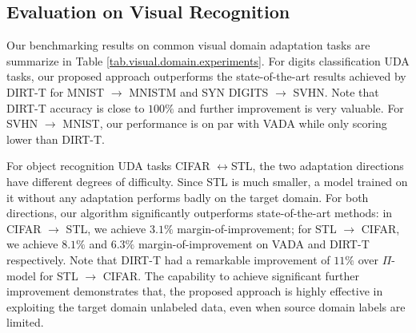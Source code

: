 \begin{table}[t]
\centering
{}
\caption{Test set accuracy ($\%$) on WiFi HAR UDA task.}
\label{tab.non-visual-domain.wifi.experiments}
\end{table}


\subsection{Evaluation on Visual Recognition}
Our benchmarking results on common visual domain adaptation tasks are summarize in Table \ref{tab.visual.domain.experiments}. For digits classification UDA tasks, our proposed approach outperforms the state-of-the-art results achieved by DIRT-T for MNIST $\rightarrow$ MNISTM and SYN DIGITS $\rightarrow$ SVHN. Note that DIRT-T accuracy is close to $100\%$ and further improvement is very valuable. For SVHN $\rightarrow$ MNIST, our performance is on par with VADA while only scoring lower than DIRT-T. 











For object recognition UDA tasks CIFAR $\leftrightarrow$STL, the two adaptation directions have different degrees of difficulty. Since STL is much smaller, a model trained on it without any adaptation performs badly on the target domain. For both directions, our algorithm significantly outperforms state-of-the-art methods: in CIFAR $\rightarrow$ STL, we achieve $3.1\%$ margin-of-improvement; for STL $\rightarrow$ CIFAR, we achieve $8.1\%$ and $6.3\%$ margin-of-improvement on VADA and DIRT-T respectively. Note that DIRT-T had a remarkable improvement of $11\%$ over $\Pi$-model for STL $\rightarrow$ CIFAR. The capability to achieve significant further improvement demonstrates that, the proposed approach is highly effective in exploiting the target domain unlabeled data, even when source domain labels are limited.


























